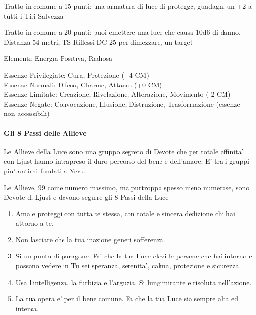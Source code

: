 \documentclass[a4paper,11pt,twoside,openany]{dndbook}
\begin{document}
{Tratto in comune a 15 punti: una armatura di luce di protegge, guadagni un +2 a tutti i Tiri Salvezza

Tratto in comune a 20 punti: puoi emettere una luce che causa 10d6 di danno. Distanza 54 metri, TS Riflessi DC 25 per dimezzare, un target

\bigskip

Elementi: Energia Positiva, Radiosa

\bigskip

Essenze Privilegiate: Cura, Protezione (+4 CM)\\
Essenze Normali: Difesa, Charme, Attacco (+0 CM)\\
Essenze Limitate: Creazione, Rivelazione, Alterazione, Movimento (-2 CM)
Essenze Negate: Convocazione, Illusione, Distruzione, Trasformazione (essenze non accessibili)

\paragraph{Gli 8 Passi delle Allieve}

\label{gli-8-passi-delle-allieve}

Le Allieve della Luce sono una gruppo segreto di Devote che per totale affinita' con Ljust hanno intrapreso il duro percorso del bene e dell'amore. E' tra i gruppi piu' antichi fondati a Yeru.

Le Allieve, 99 come numero massimo, ma purtroppo spesso meno numerose, sono Devote di Ljust e devono seguire gli 8 Passi della Luce

\begin{enumerate}
	\item Ama e proteggi con tutta te stessa, con totale e sincera dedizione chi hai attorno a te.
	
	\item Non lasciare che la tua inazione generi sofferenza.

	\item Si un punto di paragone. Fai che la tua Luce elevi le persone che hai intorno e possano vedere in Tu sei speranza, serenita', calma, protezione e sicurezza.

	\item Usa l'intelligenza, la furbizia e l'arguzia. Si lungimirante e risoluta nell'azione.

	\item La tua opera e' per il bene comune. Fa che la tua Luce sia sempre alta ed intensa.


\end{enumerate}}
\end{document}
